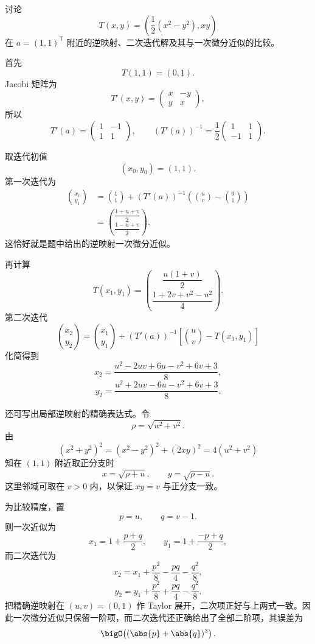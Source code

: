 \begin{xreferenceproblem}[20.5.2 第二组参考题 4]
讨论
\[
  T(x,y)=\left(\frac12(x^2-y^2),xy\right)
\]
在 $a=(1,1)^{\mathsf T}$ 附近的逆映射、二次迭代解及其与一次微分近似的比较。
\end{xreferenceproblem}
\begin{xsolution}
首先
\[
  T(1,1)=(0,1).
\]
Jacobi 矩阵为
\[
  T'(x,y)=
  \begin{pmatrix}
    x&-y\\y&x
  \end{pmatrix},
\]
所以
\[
  \boxed{\displaystyle
  T'(a)=\begin{pmatrix}1&-1\\1&1\end{pmatrix}},
  \qquad
  \boxed{\displaystyle
  (T'(a))^{-1}=\frac12
  \begin{pmatrix}1&1\\-1&1\end{pmatrix}}.
\]

取迭代初值
\[
  (x_0,y_0)=(1,1).
\]
第一次迭代为
\begin{align*}
  \binom{x_1}{y_1}
  &=\binom11+(T'(a))^{-1}
    \left(\binom uv-\binom01\right)\\
  &=\binom{\dfrac{1+u+v}{2}}
           {\dfrac{1-u+v}{2}}.
\end{align*}
这恰好就是题中给出的逆映射一次微分近似。

再计算
\[
  T(x_1,y_1)
  =\binom{\dfrac{u(1+v)}2}
          {\dfrac{1+2v+v^2-u^2}{4}}.
\]
第二次迭代
\[
  \binom{x_2}{y_2}
  =\binom{x_1}{y_1}
   +(T'(a))^{-1}
    \left[\binom uv-T(x_1,y_1)\right]
\]
化简得到
\[
  \boxed{\displaystyle
  x_2=\frac{u^2-2uv+6u-v^2+6v+3}{8}},
\]
\[
  \boxed{\displaystyle
  y_2=\frac{u^2+2uv-6u-v^2+6v+3}{8}}.
\]

还可写出局部逆映射的精确表达式。令
\[
  \rho=\sqrt{u^2+v^2}.
\]
由
\[
  (x^2+y^2)^2=(x^2-y^2)^2+(2xy)^2=4(u^2+v^2)
\]
知在 $(1,1)$ 附近取正分支时
\[
  \boxed{\displaystyle
    x=\sqrt{\rho+u},\qquad
    y=\sqrt{\rho-u}}.
\]
这里邻域可取在 $v>0$ 内，以保证 $xy=v$ 与正分支一致。

为比较精度，置
\[
  p=u,\qquad q=v-1.
\]
则一次近似为
\[
  x_1=1+\frac{p+q}{2},
  \qquad
  y_1=1+\frac{-p+q}{2},
\]
而二次迭代为
\[
  x_2=x_1+\frac{p^2}{8}-\frac{pq}{4}-\frac{q^2}{8},
\]
\[
  y_2=y_1+\frac{p^2}{8}+\frac{pq}{4}-\frac{q^2}{8}.
\]
把精确逆映射在 $(u,v)=(0,1)$ 作 Taylor 展开，二次项正好与上两式一致。因此一次微分近似只保留一阶项，而二次迭代还正确给出了全部二阶项，其误差为
\[
  \bigO\!\left((\abs{p}+\abs{q})^3\right).
\]
\end{xsolution}

